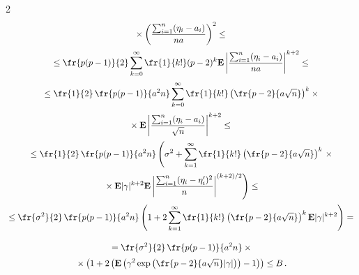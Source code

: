\begin{multicols}{2}
\begin{multline*}


{}\times\left(\frac{


\sum_{i=1}^n(\eta_i-a_i)}{na}\right)^2\le{}\\[2pt]


{}


\le\fr{p(p-1)}{2}\sum_{k=0}^{\infty}\fr{1}{k!}(p-2)^k{\E}\left|\frac{


\sum_{i=1}^n(\eta_i-a_i)}{na}\right|^{k+2}\le{}\\[2pt]


{}


\le\fr{1}{2}\,\fr{p(p-1)}{a^2n}\sum_{k=0}^{\infty}\fr{1}{k!}\left(\fr{p-2}{a\sqrt{n}}


\right)^k\times{}\\[2pt]


{}\times {\E}\left|\frac{


\sum_{i=1}^n(\eta_i-a_i)}{\sqrt{n}}\right|^{k+2}\le{}\\[2pt]


{}


\le\fr{1}{2}\,\fr{p(p-1)}{a^2n}\left(


\vphantom{\frac{


\sum_{i=1}^n(\eta_i-\eta'_i)^2}{n}}


\sigma^2+\sum_{k=1}^{\infty}\fr{1}{k!}\left(\fr{p-2}{a\sqrt{n}}


\right)^k\right.\times {}\\[2pt]


{}\left.{}\times {\E}|\gamma|^{k+2}{\E}\left|\frac{


\sum_{i=1}^n(\eta_i-\eta'_i)^2}{n}\right|^{(k+2)/2}\right)\le{}\\[2pt]


{}\le


\fr{\sigma^2}{2}\,\fr{p(p-1)}{a^2n}\left(1+2\sum_{k=1}^{\infty}\fr{1}{k!}\left(\fr{p-2}{a\sqrt{n}}


\right)^k{\E}|\gamma|^{k+2}\right)={}\\[9pt]


{}=


\fr{\sigma^2}{2}\,\fr{p(p-1)}{a^2n}\times{}\\[2pt]


{}\times \left(1+2\left({\E}\left(\gamma^2\exp


\left(\fr{p-2}{a\sqrt{n}}|\gamma|\right)\right)-1 \right)


\right) \le B\,.


\end{multline*}



\end{multicols}
